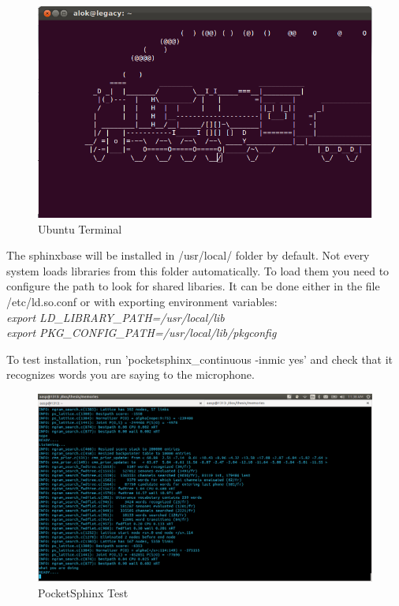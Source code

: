 \documentclass[12pt,a4paper,oneside]{memoir}
\begin{document}
\begin{figure}[h]
    \centering
    \includegraphics[scale=0.55]{networknuts-linux-fun}
    \caption{Ubuntu Terminal}
\end{figure}

The sphinxbase will be installed in /usr/local/ folder by default. Not every system loads libraries from this folder automatically. To load them you need to configure the path to look for shared libaries. It can be done either in the file /etc/ld.so.conf or with exporting environment variables:
\\
\textit{export LD\_LIBRARY\_PATH=/usr/local/lib} \\
\textit{export PKG\_CONFIG\_PATH=/usr/local/lib/pkgconfig}


To test installation, run 'pocketsphinx\_continuous -inmic yes' and check that it recognizes words you are saying to the microphone. 

\begin{figure}[h]
    \centering
    \includegraphics[scale=0.3]{Screenshot1}
    \caption{PocketSphinx Test}
\end{figure}
\end{document}
